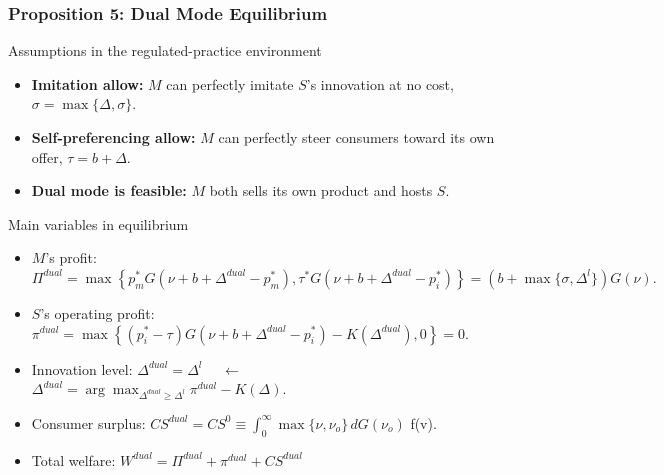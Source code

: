 
\begin{frame}
  \frametitle{Proposition 5: Dual Mode Equilibrium}
  \scriptsize
  \begin{block}{Assumptions in the regulated-practice environment}
    \begin{itemize}
      \item \textbf{Imitation allow:} $M$ can perfectly imitate $S$'s innovation at no cost, $\sigma = \max\{\Delta, \sigma\}$.
      \item \textbf{Self-preferencing allow:} $M$ can perfectly steer consumers toward its own offer, $\tau = b + \Delta$.
      \item \textbf{Dual mode is feasible:} $M$ both sells its own product and hosts $S$.
    \end{itemize}
  \end{block}

  \begin{block}{Main variables in equilibrium}
    \begin{itemize}
      \item $M$'s profit: $\Pi^{dual}= \max\left\{p^*_m G(\nu+b+\Delta^{dual}-p^*_m), \tau^* G(\nu+b+\Delta^{dual}-p^*_i)\right\} = (b+\max\{\sigma,\Delta^l\})G(\nu).$
      \item $S$'s operating profit: $\pi^{dual}= \max\left\{(p_i^*-\tau)G(\nu+b+\Delta^{dual}-p_i^*) - K(\Delta^{dual}), 0 \right\}=0$.
      \item Innovation level: $\Delta^{dual} = \Delta^l$ $\quad \leftarrow \quad$ $\Delta^{dual}= \arg\max_{\Delta^{dual} \geq \Delta^l} \pi^{dual} - K(\Delta)$.
      \item Consumer surplus: $CS^{dual}=CS^0\equiv \int_0^\infty \max\{\nu,\nu_o\}\,dG(\nu_o)$ \equiv f(v).
      \item Total welfare: $W^{dual}=\Pi^{dual}+\pi^{dual}+CS^{dual}$
    \end{itemize}
  \end{block}
\end{frame}

